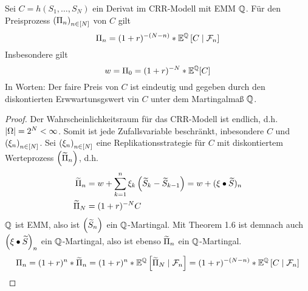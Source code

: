 \begin{theorem}
	\label{theorem: 2.7}
	Sei $C= h(S_1, \dots, S_N)$ ein Derivat im CRR-Modell mit EMM $\mathbb{Q}$. Für den Preisprozess $\left( \Pi_n \right)_{n \in [N]}$ von $C$ gilt
	\begin{equation*}
		\Pi_n = (1+r)^{-(N-n)} * \mathbb{E}^{\mathbb{Q}}\left[ C \mid \mathcal{F}_n \right]
	\end{equation*}
	Insbesondere gilt
	\begin{equation*}
		w = \Pi_0 = (1+r)^{-N} * \mathbb{E}^{\mathbb{Q}}[C]
	\end{equation*}
	In Worten: Der faire Preis von $C$ ist eindeutig und gegeben durch den diskontierten Erwwartunsgswert vin $C$ unter dem Martingalmaß $\mathbb{Q}$.
\end{theorem}
\begin{proof}
	Der Wahrscheinlichkeitsraum für das CRR-Modell ist endlich, d.h. $\left| \Omega \right| = 2^N < \infty$. Somit ist jede Zufallsvariable beschränkt, inbesondere $C$ und $\left( \xi_n \right)_{n \in [N]}$. Sei $\left( \xi_n \right)_{n \in [N]}$ eine Replikationsstrategie für $C$ mit diskontiertem Werteprozess $\left( \widetilde{\Pi}_n \right)_{}$, d.h.
	\begin{equation*}
		\begin{aligned}
			\widetilde{\Pi}_n &= w + \sum_{k=1}^n \xi_k \left( \widetilde{S}_k - \widetilde{S}_{k-1} \right) = w + (\xi \bullet \widetilde{S})_n \\
			\widetilde{\Pi}_N &= (1+r)^{-N} C
		\end{aligned}
	\end{equation*}
	$\mathbb{Q}$ ist EMM, also ist $\left( \widetilde{S}_n \right)_{}$ ein $\mathbb{Q}$-Martingal. Mit Theorem 1.6 ist demnach auch $\left( \xi \bullet \widetilde{S} \right)_{n}$ ein $\mathbb{Q}$-Martingal, also ist ebenso $\widetilde{\Pi}_n$ ein $\mathbb{Q}$-Martingal.
	\begin{equation*}
		\Pi_n = (1+r)^{n} * \widetilde{\Pi}_n = (1+r)^n * \mathbb{E}^{\mathbb{Q}} \left[ \widetilde{\Pi}_N \mid \mathcal{F}_n \right] = (1+r)^{-(N-n)} * \mathbb{E}^{\mathbb{Q}}\left[ C \mid \mathcal{F}_n \right]
	\end{equation*}
\end{proof}

